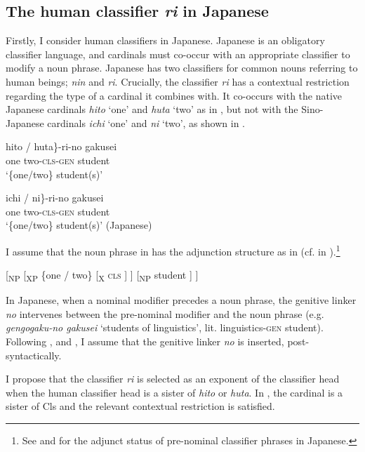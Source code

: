 \documentclass[output=paper]{langscibook}
\begin{document}
\subsection{The human classifier \textit{ri} in Japanese}\label{tat:sec:add.ja}
Firstly, I consider human classifiers in Japanese. Japanese is an obligatory classifier language, and cardinals must co-occur with an appropriate classifier to modify a noun phrase. Japanese has two classifiers for common nouns referring to human beings; \textit{nin} and \textit{ri}. Crucially, the classifier \textit{ri} has a contextual restriction regarding the type of a cardinal it combines with. It co-occurs with the native Japanese cardinals \textit{hito} `one' and \textit{huta} `two' as in , but not with the Sino-Japanese cardinals \textit{ichi} `one' and \textit{ni} `two', as shown in .


\ea
\ea\label{tat:ex:jap.cls.selection.1.2}
\gll\minsp{\{} hito / huta\textnormal{\}}-ri-no gakusei\\  
      {} one {} two-\textsc{cls-gen} student\\ 
\glt `\{one/two\} student(s)'

\ex
\gll \minsp{\{*} ichi / \minsp{*} ni\textnormal{\}}-ri-no gakusei\\  
      {} one {} {} two-\textsc{cls-gen} student\\ 
\glt `\{one/two\} student(s)' \hfill(Japanese)
\z\z

\noindent I assume that the noun phrase in  has the adjunction structure as in  (cf.  in ).\footnote{See \citet{SaitoMurasugi1990} and \citet{HuangOchi2014} for the adjunct status of pre-nominal classifier phrases in Japanese.}

\ea\label{tat:jap.cls}
[\textsubscript{NP} [\textsubscript{XP} \{one / two\} [\textsubscript{X} \textsc{cls} ] ] [\textsubscript{NP} student ] ]
\z

\noindent In Japanese, when a nominal modifier precedes a noun phrase, the genitive linker \textit{no} intervenes between the pre-nominal modifier and the noun phrase (e.g. \textit{gen\-go\-gaku-no gakusei} `students of linguistics', lit. linguistics-\textsc{gen} student). Following \citet{KitagawaRoss1982}, and \citet{Watanabe2006}, I assume that the genitive linker \textit{no} is inserted, post-syntactically. 

I propose that the classifier \textit{ri} is selected as an exponent of the classifier head when the human classifier head is a sister of \textit{hito} or \textit{huta}. In , the cardinal is a sister of Cls and the relevant contextual restriction is satisfied.
\end{document}
